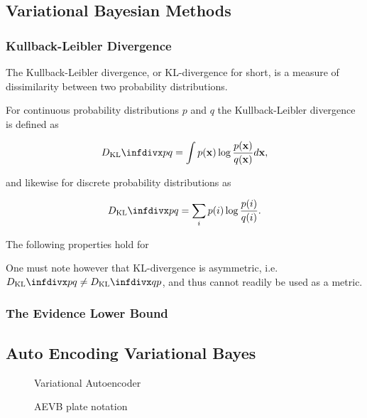 \subsection{Variational Bayesian Methods}
\label{subsection:variational_inference}

\subsubsection{Kullback-Leibler Divergence}

The Kullback-Leibler divergence, or KL-divergence for short, is a measure of dissimilarity between two probability distributions.

For continuous probability distributions $p$ and $q$ the Kullback-Leibler divergence is defined as

$$\dkl{p}{q} = \int p(\mathbf{x}) \log \frac{p(\mathbf{x})}{q(\mathbf{x})} d\mathbf{x},$$

and likewise for discrete probability distributions as

$$\dkl{p}{q} = \sum_{i} p(i) \log \frac{p(i)}{q(i)}.$$

The following properties hold for 

One must note however that KL-divergence is asymmetric, i.e. $\dkl{p}{q} \neq \dkl{q}{p}$, and thus cannot readily be used as a metric.

\subsubsection{The Evidence Lower Bound}

\newpage

\subsection{Auto Encoding Variational Bayes}

\begin{figure}[!htb]
  \centering
  \resizebox{\textwidth}{!}{\unskip}
  \caption{Variational Autoencoder}
  \label{fig:vae}
\end{figure}

\begin{figure}[!htb]
  \centering
  \resizebox{0.3\textwidth}{!}{\unskip}
  \caption{AEVB plate notation}
  \label{fig:aevb_plate_notation}
\end{figure}

\newcommand{\ptheta}{p_{\mathbf{\theta}}}
\newcommand{\qphi}{q_{\mathbf{\phi}}}
\newcommand{\bxi}{\mathbf{x}^{(i)}}
\newcommand{\bz}{\mathbf{z}}

